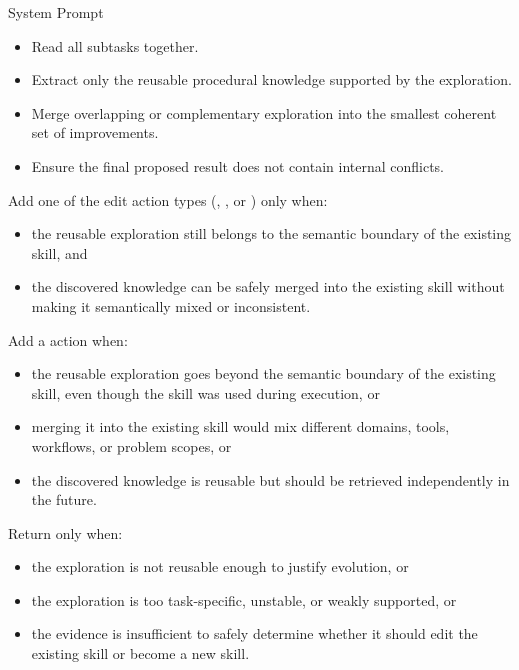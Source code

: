\begin{svpromptbox}{System Prompt}
\begin{itemize}
\item Read all subtasks together.
\item Extract only the reusable procedural knowledge supported by the exploration.
\item Merge overlapping or complementary exploration into the smallest coherent set of improvements.
\item Ensure the final proposed result does not contain internal conflicts.
\end{itemize}
\smallskip
{}
Add one of the edit action types (, , or ) only when:\par
\begin{itemize}
\item the reusable exploration still belongs to the semantic boundary of the existing skill, and
\item the discovered knowledge can be safely merged into the existing skill without making it semantically mixed or inconsistent.
\end{itemize}
\smallskip
Add a  action when:\par
\begin{itemize}
\item the reusable exploration goes beyond the semantic boundary of the existing skill, even though the skill was used during execution, or
\item merging it into the existing skill would mix different domains, tools, workflows, or problem scopes, or
\item the discovered knowledge is reusable but should be retrieved independently in the future.
\end{itemize}
\smallskip
Return  only when:\par
\begin{itemize}
\item the exploration is not reusable enough to justify evolution, or
\item the exploration is too task-specific, unstable, or weakly supported, or
\item the evidence is insufficient to safely determine whether it should edit the existing skill or become a new skill.
\end{itemize}
\smallskip
{}

\end{svpromptbox}
